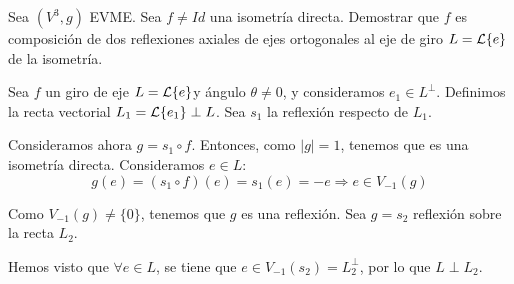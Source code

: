 \begin{ejercicio}
    Sea $(V^3, g)$ EVME. Sea $f\neq Id$ una isometría directa. Demostrar que $f$ es composición de dos reflexiones axiales de ejes ortogonales al eje de giro $L=\mathcal{L}\{e\}$ de la isometría.


    Sea $f$ un giro de eje $L=\mathcal{L}\{e\}$y ángulo $\theta \neq 0$, y consideramos $e_1\in L^\perp$. Definimos la recta vectorial $L_1=\mathcal{L}\{e_1\}\perp L$. Sea $s_1$ la reflexión respecto de $L_1$.

    Consideramos ahora $g=s_1\circ f$. Entonces, como $|g|=1$, tenemos que es una isometría directa. Consideramos $e\in L$:
    \begin{equation*}
        g(e)=(s_1\circ f)(e)=s_1(e)=-e \Longrightarrow e\in V_{-1}(g)
    \end{equation*}

    Como $V_{-1}(g)\neq \{0\}$, tenemos que $g$ es una reflexión. Sea $g=s_2$ reflexión sobre la recta $L_2$.
    
    Hemos visto que $\forall e\in L$, se tiene que $e\in V_{-1}(s_2)=L_2^\perp$, por lo que $L\perp L_2$.

    \begin{comment}
        

    Consideramos dos rectas axiales, $L_1=\cc{L}\{e_1\}, L_2=\cc{L}\{e_2\}$; y las simetrías respecto de dichas rectas, $s_1, s_2$. Supongamos ahora $f=s_1\circ s_2$.


    Sea $f=s_1\circ s_2$ composición de dos simetrías axiales, con $L_2\perp L$. Veamos que $L_1\perp L$.
    \begin{equation*}
        e=f(e)=(s_1\circ s_2)(e)=s_1(-e)\Longrightarrow e\in V_{-1}(s_1)
    \end{equation*}
    Por tanto, tenemos que $L\subset L_1^\perp$, por lo que $L\perp L_1$.
    \end{comment}
\end{ejercicio}

